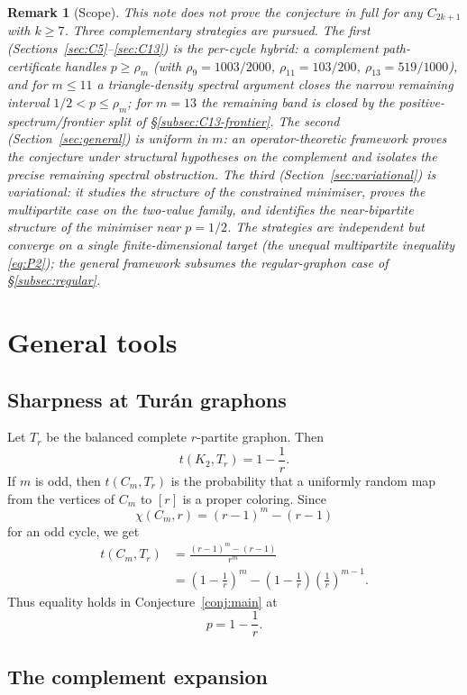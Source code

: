 \documentclass[11pt]{article}
\newtheorem{remark}[theorem]{Remark}
\begin{document}
\begin{remark}[Scope]
This note does \emph{not} prove the conjecture in full for any $C_{2k+1}$ with $k\ge7$.  Three complementary strategies are pursued.  The first (Sections~\ref{sec:C5}--\ref{sec:C13}) is the per-cycle hybrid: a complement path-certificate handles $p\ge \rho_m$ (with $\rho_9=1003/2000$, $\rho_{11}=103/200$, $\rho_{13}=519/1000$), and for $m\le11$ a triangle-density spectral argument closes the narrow remaining interval $1/2<p\le\rho_m$; for $m=13$ the remaining band is closed by the positive-spectrum/frontier split of \S\ref{subsec:C13-frontier}.  The second (Section~\ref{sec:general}) is uniform in $m$: an operator-theoretic framework proves the conjecture under structural hypotheses on the complement and isolates the precise remaining spectral obstruction.  The third (Section~\ref{sec:variational}) is variational: it studies the structure of the constrained minimiser, proves the multipartite case on the two-value family, and identifies the near-bipartite structure of the minimiser near $p=1/2$.  The strategies are independent but converge on a single finite-dimensional target (the unequal multipartite inequality \eqref{eq:P2}); the general framework subsumes the regular-graphon case of \S\ref{subsec:regular}.
\end{remark}

\section{General tools}

\subsection{Sharpness at Tur\'an graphons}

Let $T_r$ be the balanced complete $r$-partite graphon.  Then
\[
        t(K_2,T_r)=1-\frac1r.
\]
If $m$ is odd, then $t(C_m,T_r)$ is the probability that a uniformly random map from the vertices of $C_m$ to $[r]$ is a proper coloring.  Since
\[
        \chi(C_m,r)=(r-1)^m-(r-1)
\]
for an odd cycle, we get
\[
\begin{aligned}
        t(C_m,T_r)
        &=\frac{(r-1)^m-(r-1)}{r^m}  \\
        &=\left(1-\frac1r\right)^m
          -\left(1-\frac1r\right)\left(\frac1r\right)^{m-1}.
\end{aligned}
\]
Thus equality holds in Conjecture~\ref{conj:main} at
\[
        p=1-\frac1r.
\]

\subsection{The complement expansion}
\end{document}
